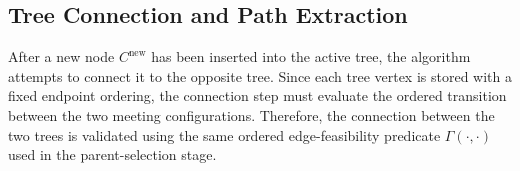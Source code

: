 \documentclass{pas}
\begin{document}

\subsection{Tree Connection and Path Extraction}
\label{subsec:gcr_tree_connection}

After a new node \(C^{\mathrm{new}}\) has been inserted into the active tree,
the algorithm attempts to connect it to the opposite tree. Since each tree vertex
is stored with a fixed endpoint ordering, the connection step must evaluate the
ordered transition between the two meeting configurations. Therefore, the
connection between the two trees is validated using the same ordered
edge-feasibility predicate \(\Gamma(\cdot,\cdot)\) used in the parent-selection
stage.
\end{document}
